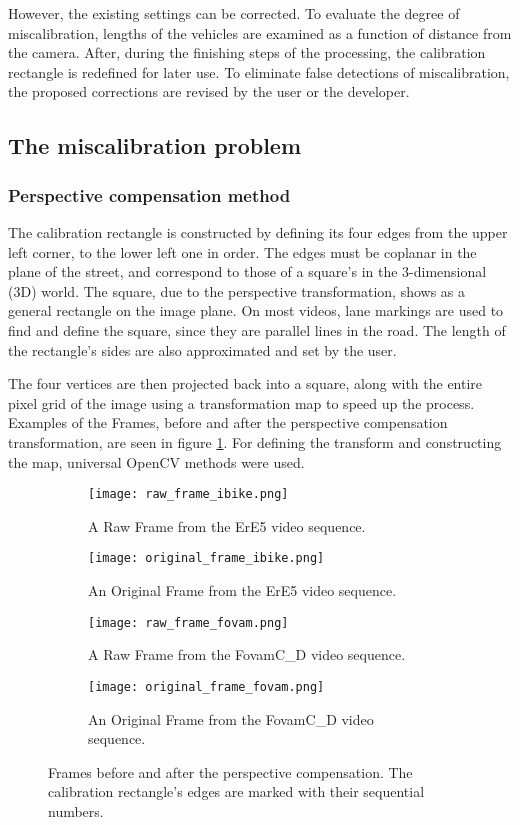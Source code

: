 However, the existing settings can be corrected.
To evaluate the degree of miscalibration, lengths of the vehicles are examined as a function of distance from the camera.
After, during the finishing steps of the processing, the calibration rectangle is redefined for later use.
To eliminate false detections of miscalibration, the proposed corrections are revised by the user or the developer.

\subsection{The miscalibration problem}
\subsubsection{Perspective compensation method}
The calibration rectangle is constructed by defining its four edges from the upper left corner, to the lower left one in order.
The edges must be coplanar in the plane of the street, and correspond to those of a square's in the 3-dimensional (3D) world.
The square, due to the perspective transformation, shows as a general rectangle on the image plane.
On most videos, lane markings are used to find and define the square, since they are parallel lines in the road.
The length of the rectangle's sides are also approximated and set by the user.

The four vertices are then projected back into a square, along with the entire pixel grid of the image using a transformation map to speed up the process.
Examples of the Frames, before and after the perspective compensation transformation, are seen in figure \ref{fig:perscomp}.
For defining the transform and constructing the map, universal OpenCV methods were used\cite{PersTrans, WrapPers}.

\begin{figure}[!t]
	\centering
		\begin{subfigure}[b]{0.4\textwidth}
			\texttt{[image: raw\_frame\_ibike.png]}
			\caption{A Raw Frame from the ErE5 video sequence.}
		\end{subfigure}
		\quad
		\begin{subfigure}[b]{0.4\textwidth}
			\texttt{[image: original\_frame\_ibike.png]}
			\caption{An Original Frame from the ErE5 video sequence.}
		\end{subfigure}
		\hfill
		\begin{subfigure}[b]{0.4\textwidth}
			\texttt{[image: raw\_frame\_fovam.png]}
			\caption{A Raw Frame from the FovamC\_D video sequence.}
		\end{subfigure}
		\quad
		\begin{subfigure}[b]{0.4\textwidth}
			\texttt{[image: original\_frame\_fovam.png]}
			\caption{An Original Frame from the FovamC\_D video sequence.}
		\end{subfigure}
		
		\caption{Frames before and after the perspective compensation. The calibration rectangle's edges are marked with their sequential numbers.\label{fig:perscomp}}
\end{figure}

